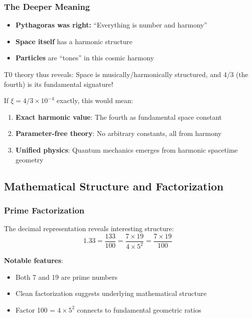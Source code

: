 	\subsubsection{The Deeper Meaning}
	\label{subsubsec:deeper_meaning}
	
	\begin{tcolorbox}[colback=green!5!white,colframe=green!75!black,title=The Pythagorean Truth]
		\begin{itemize}
			\item \textbf{Pythagoras was right:} ``Everything is number and harmony''
			\item \textbf{Space itself} has a harmonic structure
			\item \textbf{Particles} are ``tones'' in this cosmic harmony
		\end{itemize}
	\end{tcolorbox}
	
	T0 theory thus reveals: Space is musically/harmonically structured, and 4/3 (the fourth) is its fundamental signature!
	
	If $\xi = 4/3 \times 10^{-4}$ exactly, this would mean:
	\begin{enumerate}
		\item \textbf{Exact harmonic value}: The fourth as fundamental space constant
		\item \textbf{Parameter-free theory}: No arbitrary constants, all from harmony
		\item \textbf{Unified physics}: Quantum mechanics emerges from harmonic spacetime geometry
	\end{enumerate}
	
	\subsection{Mathematical Structure and Factorization}
	\label{subsec:mathematical_structure}
	
	\subsubsection{Prime Factorization}
	\label{subsubsec:prime_factorization}
	
	The decimal representation reveals interesting structure:
	\begin{equation}
		1.33 = \frac{133}{100} = \frac{7 \times 19}{4 \times 5^2} = \frac{7 \times 19}{100}
		\label{eq:factorization}
	\end{equation}
	
	\textbf{Notable features}:
	\begin{itemize}
		\item Both 7 and 19 are prime numbers
		\item Clean factorization suggests underlying mathematical structure
		\item Factor 100 = $4 \times 5^2$ connects to fundamental geometric ratios
	\end{itemize}
	
